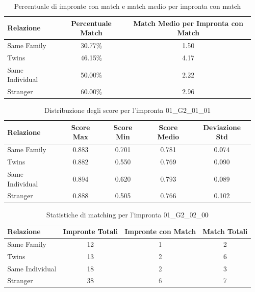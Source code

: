 \begin{table}[htbp]
\centering
\caption{Percentuale di impronte con match e match medio per impronta con match}
\label{tab:match_percentage_01_G2_01_01}
\begin{tabular}{|l|c|c|}
\hline
\textbf{Relazione} & \textbf{Percentuale Match} & \textbf{Match Medio per Impronta con Match} \\
\hline
Same Family & 30.77\% & 1.50 \\
\hline
Twins & 46.15\% & 4.17 \\
\hline
Same Individual & 50.00\% & 2.22 \\
\hline
Stranger & 60.00\% & 2.96 \\
\hline
\end{tabular}
\end{table}


\begin{table}[htbp]
\centering
\caption{Distribuzione degli score per l'impronta 01\_G2\_01\_01}
\label{tab:scores_01_G2_01_01}
\begin{tabular}{|l|c|c|c|c|}
\hline
\textbf{Relazione} & \textbf{Score Max} & \textbf{Score Min} & \textbf{Score Medio} & \textbf{Deviazione Std} \\
\hline
Same Family & 0.883 & 0.701 & 0.781 & 0.074 \\
\hline
Twins & 0.882 & 0.550 & 0.769 & 0.090 \\
\hline
Same Individual & 0.894 & 0.620 & 0.793 & 0.089 \\
\hline
Stranger & 0.888 & 0.505 & 0.766 & 0.102 \\
\hline
\end{tabular}
\end{table}


\begin{table}[htbp]
\centering
\caption{Statistiche di matching per l'impronta 01\_G2\_02\_00}
\label{tab:results_01_G2_02_00}
\begin{tabular}{|l|c|c|c|}
\hline
\textbf{Relazione} & \textbf{Impronte Totali} & \textbf{Impronte con Match} & \textbf{Match Totali} \\
\hline
Same Family & 12 & 1 & 2 \\
\hline
Twins & 13 & 2 & 6 \\
\hline
Same Individual & 18 & 2 & 3 \\
\hline
Stranger & 38 & 6 & 7 \\
\hline
\end{tabular}
\end{table}


